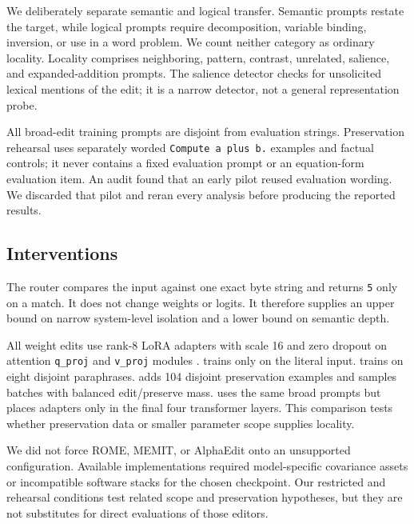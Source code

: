 We deliberately separate semantic and logical transfer. Semantic prompts restate the target, while logical prompts require decomposition, variable binding, inversion, or use in a word problem. We count neither category as ordinary locality. Locality comprises neighboring, pattern, contrast, unrelated, salience, and expanded-addition prompts. The salience detector checks for unsolicited lexical mentions of the edit; it is a narrow detector, not a general representation probe.

All broad-edit training prompts are disjoint from evaluation strings. Preservation rehearsal uses separately worded \texttt{Compute a plus b.} examples and factual controls; it never contains a fixed evaluation prompt or an equation-form evaluation item. An audit found that an early pilot reused evaluation wording. We discarded that pilot and reran every analysis before producing the reported results.

\subsection{Interventions}



The router compares the input against one exact byte string and returns \texttt{5} only on a match. It does not change weights or logits. It therefore supplies an upper bound on narrow system-level isolation and a lower bound on semantic depth.

All weight edits use rank-8 LoRA adapters with scale 16 and zero dropout on attention \texttt{q\_proj} and \texttt{v\_proj} modules \cite{hu2022lora}. \exactlora trains only on the literal input. \broadlora trains on eight disjoint paraphrases. \rehearsallora adds 104 disjoint preservation examples and samples batches with balanced edit/preserve mass. \restrictedlora uses the same broad prompts but places adapters only in the final four transformer layers. This comparison tests whether preservation data or smaller parameter scope supplies locality.

We did not force ROME, MEMIT, or AlphaEdit onto an unsupported configuration. Available implementations required model-specific covariance assets or incompatible software stacks for the chosen checkpoint. Our restricted and rehearsal conditions test related scope and preservation hypotheses, but they are not substitutes for direct evaluations of those editors.

